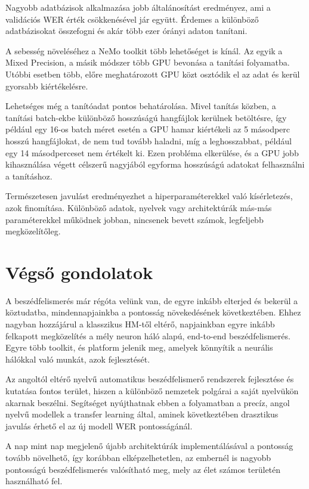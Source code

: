 Nagyobb adatbázisok alkalmazása jobb általánosítást eredményez, ami a validációs WER érték csökkenésével jár együtt. Érdemes a különböző adatbázisokat összefogni és akár több ezer órányi adaton tanítani.

A sebesség növeléséhez a NeMo toolkit több lehetőséget is kínál. Az egyik a Mixed Precision, a másik módszer több GPU bevonása a tanítási folyamatba. Utóbbi esetben több, előre meghatározott GPU közt osztódik el az adat és kerül gyorsabb kiértékelésre.


Lehetséges még a tanítóadat pontos behatárolása. Mivel tanítás közben, a tanítási batch-ekbe különböző hosszúságú hangfájlok kerülnek betöltésre, így például egy 16-os batch méret esetén a GPU hamar kiértékeli az 5 másodperc hosszú hangfájlokat, de nem tud tovább haladni, míg a leghosszabbat, például egy 14 másodperceset nem értékelt ki. Ezen probléma elkerülése, és a GPU jobb kihasználása végett célszerű nagyjából egyforma hosszúságú adatokat felhasználni a tanításhoz.

Természetesen javulást eredményezhet a hiperparaméterekkel való kísérletezés, azok finomítása. Különböző adatok, nyelvek vagy architektúrák más-más paraméterekkel működnek jobban, nincsenek bevett számok, legfeljebb megközelítőleg.

\section{Végső gondolatok}

A beszédfelismerés már régóta velünk van, de egyre inkább elterjed és bekerül a köztudatba, mindennapjainkba a pontosság növekedésének következtében. Ehhez nagyban hozzájárul a klasszikus HM-től eltérő, napjainkban egyre inkább felkapott megközelítés a mély neuron háló alapú, end-to-end beszédfelismerés. Egyre több toolkit, és platform jelenik meg, amelyek könnyítik a neurális hálókkal való munkát, azok fejlesztését.

Az angoltól eltérő nyelvű automatikus beszédfelismerő rendszerek fejlesztése és kutatása fontos terület, hiszen a különböző nemzetek polgárai a saját nyelvükön akarnak beszélni. Segítséget nyújthatnak ebben a folyamatban a precíz, angol nyelvű modellek a transfer learning által, aminek következtében drasztikus javulás érhető el az új modell WER pontosságánál.

A nap mint nap megjelenő újabb architektúrák implementálásával a pontosság tovább növelhető, így korábban elképzelhetetlen, az embernél is nagyobb pontosságú beszédfelismerés valósítható meg, mely az élet számos területén használható fel.